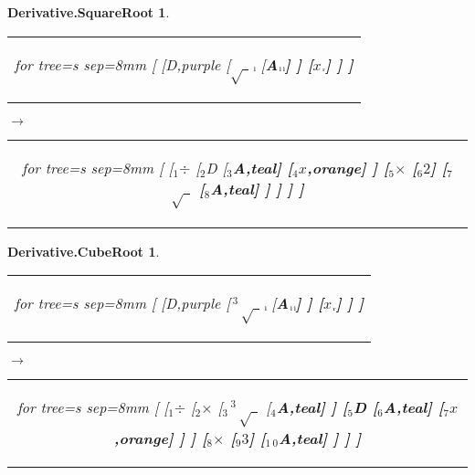 \documentclass[UTF8,10pt]{ctexart}
\newcommand{\Bigskip}{\bigskip\medskip}
\newcommand{\subtreeA}{\bf A}
\newcommand{\I}{$_{\scriptscriptstyle 1}$}
\newcommand{\II}{$_{\scriptscriptstyle 2}$}
\newcommand{\III}{$_{\scriptscriptstyle 3}$}
\newcommand{\IV}{$_{\scriptscriptstyle 4}$}
\newcommand{\V}{$_{\scriptscriptstyle 5}$}
\newcommand{\VI}{$_{\scriptscriptstyle 6}$}
\newcommand{\VII}{$_{\scriptscriptstyle 7}$}
\newcommand{\VIII}{$_{\scriptscriptstyle 8}$}
\newcommand{\IX}{$_{\scriptscriptstyle 9}$}
\newcommand{\X}{$_{\scriptscriptstyle 1\:\!\!0}$}
\newcommand{\lc}{$_{\:\!\scriptscriptstyle\rm l\!}$}
\newcommand{\rc}{$_{\:\!\scriptscriptstyle\rm r\!}$}
\newcommand{\Derivative}{\rm D}
\newcommand{\x}{$x$}
\newcommand{\Two}{$2$}
\newcommand{\Three}{$3$}
\newcommand{\Multiplication}{$\times$}
\newcommand{\Division}{$\div$}
\newcommand{\SquareRoot}{$\sqrt{\ \ }$}
\newcommand{\CubeRoot}{$\,^{\scriptscriptstyle 3\:\!\!\!\!\!\!}\sqrt{\ \ }$}
\newtheorem*{Derivative.SquareRoot}{\bf Derivative.SquareRoot }
\newtheorem*{Derivative.CubeRoot}{\bf Derivative.CubeRoot }
\begin{document}
	\newpage

	\begin{center}\vspace*{\fill}
		\begin{Derivative.SquareRoot}
			\qquad\par\Bigskip
			\begin{tabular}{c}
				\begin{forest}
					for tree={s sep=8mm}
					[
						[\Derivative,purple
							[\SquareRoot\lc
								[\subtreeA\lc\lc]
							]
							[\x\rc]
						]
					]
				\end{forest}
			\end{tabular}
			\qquad
			$\longrightarrow$
			\qquad
			\begin{tabular}{c}
				\begin{forest}
					for tree={s sep=8mm}
					[
						[\I\Division
							[\II\Derivative
								[\III\subtreeA,teal]
								[\IV\x,orange]
							]
							[\V\Multiplication
								[\VI\Two]
								[\VII\SquareRoot
									[\VIII\subtreeA,teal]
								]
							]
						]
					]
				\end{forest}
			\end{tabular}
		\end{Derivative.SquareRoot}
		\bigskip
		\begin{Derivative.CubeRoot}
			\qquad\par\Bigskip
			\begin{tabular}{c}
				\begin{forest}
					for tree={s sep=8mm}
					[
						[\Derivative,purple
							[\CubeRoot\lc
								[\subtreeA\lc\lc]
							]
							[\x\rc]
						]
					]
				\end{forest}
			\end{tabular}
			\qquad
			$\longrightarrow$
			\qquad
			\begin{tabular}{c}
				\begin{forest}
					for tree={s sep=8mm}
					[
						[\I\Division
							[\II\Multiplication
								[\III\CubeRoot
									[\IV\subtreeA,teal]
								]
								[\V\Derivative
									[\VI\subtreeA,teal]
									[\VII\x,orange]
								]
							]
							[\VIII\Multiplication
								[\IX\Three]
								[\X\subtreeA,teal]
							]
						]
					]
				\end{forest}
			\end{tabular}
		\end{Derivative.CubeRoot}
	\vspace*{\fill}\end{center}
\end{document}
